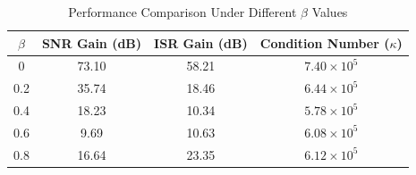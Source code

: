 \documentclass[journal]{IEEEtran}
\begin{document}
\begin{table}[!t]
\centering
\caption{Performance Comparison Under Different $\beta$ Values}
\label{tab:beta_performance}
\renewcommand{\arraystretch}{1.15}
\begin{tabular}{cccc}
\toprule
$\beta$ & SNR Gain (dB) & ISR Gain (dB) & Condition Number ($\kappa$) \\
\midrule
0   & 73.10 & 58.21 & $7.40 \times 10^{5}$ \\
0.2 & 35.74 & 18.46 & $6.44 \times 10^{5}$ \\
0.4 & 18.23 & 10.34 & $5.78 \times 10^{5}$ \\
0.6 & 9.69  & 10.63 & $6.08 \times 10^{5}$ \\
0.8 & 16.64 & 23.35 & $6.12 \times 10^{5}$ \\
\bottomrule
\end{tabular}
\end{table}



















\end{document}
